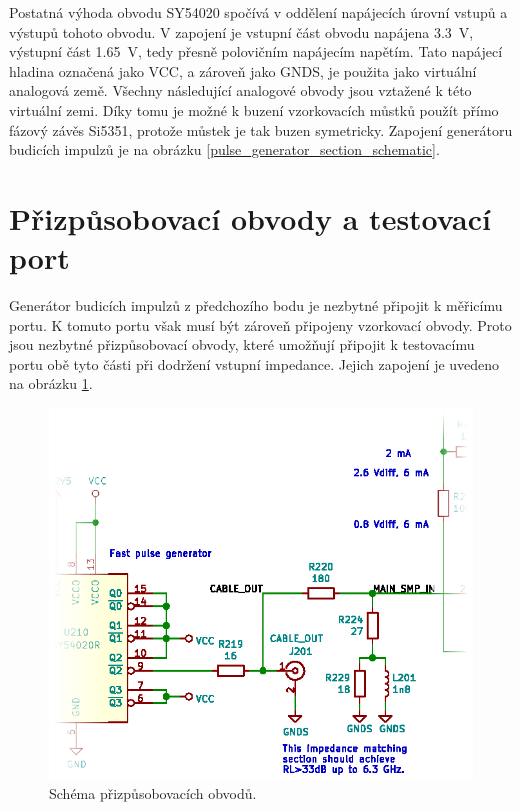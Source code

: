 Postatná výhoda obvodu SY54020 spočívá v oddělení napájecích úrovní vstupů a výstupů tohoto obvodu. V zapojení je vstupní část obvodu napájena \SI{3.3}{\volt}, výstupní část \SI{1.65}{\volt}, tedy přesně polovičním napájecím napětím. Tato napájecí hladina označená jako VCC, a zároveň jako GNDS, je použita jako virtuální analogová země. Všechny následující analogové obvody jsou vztažené k této virtuální zemi. Díky tomu je možné k buzení vzorkovacích můstků použít přímo fázový závěs Si5351, protože můstek je tak buzen symetricky. Zapojení generátoru budicích impulzů je na obrázku \ref{pulse_generator_section_schematic}.

\section{Přizpůsobovací obvody a testovací port}
Generátor budicích impulzů z předchozího bodu je nezbytné připojit k měřicímu portu. K tomuto portu však musí být zároveň připojeny vzorkovací obvody. Proto jsou nezbytné přizpůsobovací obvody, které umožňují připojit k testovacímu portu obě tyto části při dodržení vstupní impedance. Jejich zapojení je uvedeno na obrázku \ref{match_section_schematic}.

\begin{figure}[htbp]
\includegraphics[width=\textwidth,keepaspectratio]{images/match_section.eps}\caption{Schéma přizpůsobovacích obvodů.}\label{match_section_schematic}
\end{figure}

